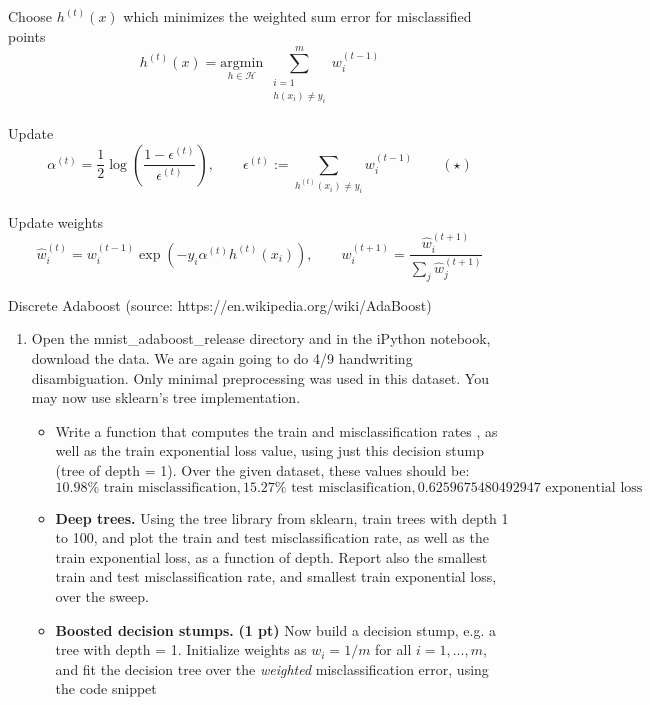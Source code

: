 \documentclass{article}
\newcommand{\argmin}[1]{\underset{#1}{\text{argmin}}}
\newcommand{\mH}{\mathcal H}
\newcommand{\showpoints}[1]{\textbf{(#1)}}
\begin{document}
\begin{enumerate}
\begin{algorithm}[H]
{	Choose $h^{(t)}(x)$ which minimizes the weighted sum error for misclassified points 
	\[
	h^{(t)}(x) = \argmin{h\in \mH}\; \sum_{\substack{i=1\\ h(x_i)\neq y_i}}^m  w_i^{(t-1)}
	\]\\
	Update 
	\[
	\alpha^{(t)} = \frac{1}{2} \log\left(\frac{1-\epsilon^{(t)}}{\epsilon^{(t)}}\right), \qquad \epsilon^{(t)} :=\sum_{h^{(t)}(x_i)\neq y_i} w^{(t-1)}_i \qquad (\star)
	\]
	\\
	
	
	Update weights 
	\[
	\hat w_i^{(t)} = w_i^{(t-1)}\exp(-y_i\alpha^{(t)} h^{(t)}(x_i)), \qquad w_i^{(t+1)} = \frac{\hat w_i^{(t+1)}}{\sum_j \hat w_j^{(t+1)}}
	\]

 }
 \caption{Discrete Adaboost (source: https://en.wikipedia.org/wiki/AdaBoost)
}
\label{alg-adaboost}
\end{algorithm}







\begin{enumerate}




\item Open the mnist\_adaboost\_release directory and in the iPython notebook, download the data. We are again going to do 4/9 handwriting disambiguation. Only minimal preprocessing was used in this dataset. You may now use sklearn's tree implementation.

\begin{itemize}
\item Write a function that computes the train and misclassification rates , as well as the train exponential loss value, using just this decision stump (tree of depth = 1). 
Over the given dataset, these values should be:
\[
10.98\% \text{ train misclassification}, 
15.27\% \text{ test misclasification},
0.6259675480492947 \text{ exponential loss}
\]


\item \textbf{Deep trees.} Using the tree library from sklearn, train trees with depth 1 to 100, and plot the train and test misclassification rate, as well as the train exponential loss, as a function of depth. Report also the smallest  train and test misclassification rate, and smallest train exponential loss, over the sweep.


\item \textbf{Boosted decision stumps.} \showpoints{1 pt} Now build  a decision stump, e.g. a tree with depth = 1. Initialize weights as $w_i = 1/m$ for all $i = 1,...,m$, and fit the decision tree over the \emph{weighted} misclassification error, using the code snippet


\end{itemize}
\end{enumerate}
\end{enumerate}
\end{document}
